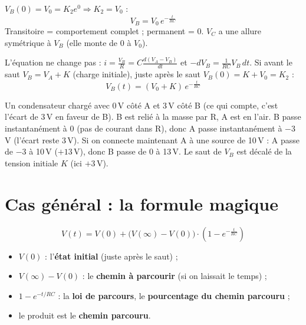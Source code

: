 
\begin{thmbox}[title={Passe-haut, cas particulier $V_B(0) = V_0$}]
$V_B(0) = V_0 = K_2e^0 \Rightarrow K_2 = V_0$ :
\[ \boxed{V_B = V_0\,e^{-\frac t{RC}}} \]
Transitoire = comportement complet ; permanent = 0. $V_C$ a une allure symétrique à $V_B$
(elle monte de 0 à $V_0$).
\end{thmbox}


\begin{thmbox}[title={Passe-haut, condition initiale différente}]
L'équation ne change pas : $i = \frac{V_B}{R} = C\frac{d(V_A - V_B)}{dt}$ et
$-dV_B = \frac1{RC}V_B\,dt$. Si avant le saut $V_B = V_A + K$ (charge initiale), juste après
le saut $V_B(0) = K + V_0 = K_2$ :
\[ V_B(t) = (V_0 + K)\,e^{-\frac t{RC}} \]
\end{thmbox}

\begin{exbox}[title={Exemple du commentaire de la diapositive}]
Un condensateur chargé avec 0\,V côté A et 3\,V côté B (ce qui compte, c'est l'écart de 3\,V
en faveur de B). B est relié à la masse par R, A est en l'air. B passe instantanément à 0
(pas de courant dans R), donc A passe instantanément à $-3$\,V (l'écart reste 3\,V). Si on
connecte maintenant A à une source de 10\,V : A passe de $-3$ à 10\,V ($+13$\,V), donc B passe
de 0 à 13\,V. Le saut de $V_B$ est décalé de la tension initiale $K$ (ici $+3$\,V).
\end{exbox}

\section{Cas général : la formule magique}


\begin{thmbox}[title={La formule magique (premier ordre, passe-bas ou passe-haut)}]
\[ \boxed{V(t) = V(0) + \big(V(\infty) - V(0)\big)\cdot\left(1 - e^{-\frac t{RC}}\right)} \]
\begin{itemize}
  \item $V(0)$ : l'\textbf{état initial} (juste après le saut) ;
  \item $V(\infty) - V(0)$ : le \textbf{chemin à parcourir} (si on laissait le temps) ;
  \item $1 - e^{-t/RC}$ : la \textbf{loi de parcours}, le \textbf{pourcentage du chemin
        parcouru} ;
  \item le produit est le \textbf{chemin parcouru}.
\end{itemize}
\end{thmbox}

